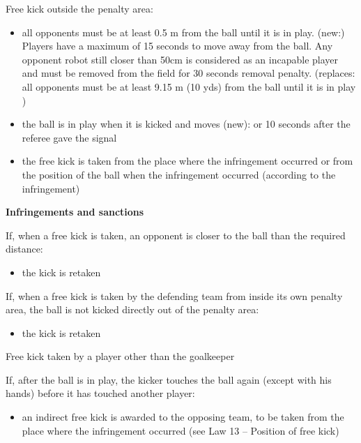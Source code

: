 {\bigskip

Free kick outside the penalty area:

\begin{itemize}
\item all opponents must be at least 0.5 m from the ball until it is in play. (new:) Players have a maximum of 15 seconds to move away from the ball. Any opponent robot still closer than 50cm is considered as an incapable player and must be removed from the field for 30 seconds removal penalty.
\textcolor[rgb]{0.4,0.4,0.4}{(replaces: all opponents must be at least 9.15 m (10 yds) from the ball until it is in play )}
\item the ball is in play when it is kicked and moves (new): or 10 seconds after the referee gave the signal
\item the free kick is taken from the place where the infringement occurred or from the position of the ball when the infringement occurred (according to the infringement)
\end{itemize}

\bigskip

{\bfseries Infringements and sanctions}

\headlinebox

If, when a free kick is taken, an opponent is closer to the ball than the required distance:

\begin{itemize}
\item the kick is retaken
\end{itemize}

\bigskip

If, when a free kick is taken by the defending team from inside its own penalty area, the ball is not kicked directly out of the penalty area:


\begin{itemize}
\item the kick is retaken
\end{itemize}

\bigskip

Free kick taken by a player other than the goalkeeper

If, after the ball is in play, the kicker touches the ball again (except with his hands) before it has touched another player:

\begin{itemize}
\item an indirect free kick is awarded to the opposing team, to be taken from the place where the infringement occurred (see Law 13 -- Position of free kick)
\end{itemize}

}
